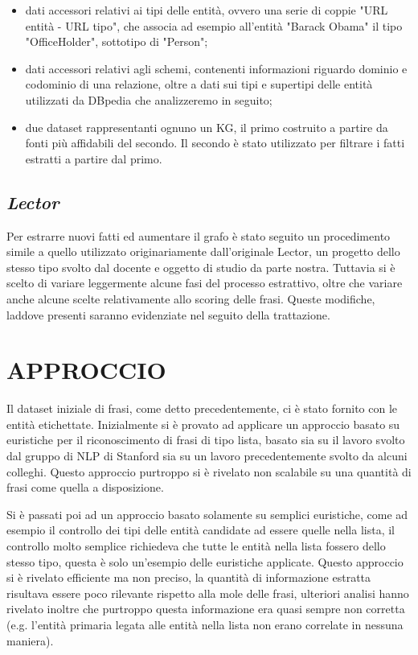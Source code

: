 \documentclass[10pt,a4paper,twocolumn]{article}
\begin{document}
\begin{itemize}
\item dati accessori relativi ai tipi delle entità, ovvero una serie di coppie "URL entità - URL tipo", che associa ad esempio all'entità "Barack Obama" il tipo "OfficeHolder", sottotipo di "Person";

\item dati accessori relativi agli schemi, contenenti informazioni riguardo dominio e codominio di una relazione, oltre a dati sui tipi e supertipi delle entità utilizzati da DBpedia che analizzeremo in seguito;

\item due dataset rappresentanti ognuno un KG, il primo costruito a partire da fonti più affidabili del secondo. Il secondo è stato utilizzato per filtrare i fatti estratti a partire dal primo.
\end{itemize}

\subsection*{\textit{Lector}}

Per estrarre nuovi fatti ed aumentare il grafo è stato seguito un procedimento simile a quello utilizzato originariamente dall'originale  Lector, un progetto dello stesso tipo svolto dal docente e oggetto di studio da parte nostra. Tuttavia si è scelto di variare leggermente alcune fasi del processo estrattivo, oltre che variare anche alcune scelte relativamente allo scoring delle frasi. Queste modifiche, laddove presenti saranno evidenziate nel seguito della trattazione.

\section{APPROCCIO}

Il dataset iniziale di frasi, come detto precedentemente, ci è stato fornito con le entità etichettate. Inizialmente si è provato ad applicare un approccio basato su euristiche per il riconoscimento di frasi di tipo lista, basato sia su il lavoro svolto dal gruppo di NLP di Stanford sia su un lavoro precedentemente svolto da alcuni colleghi. Questo approccio purtroppo si è rivelato non scalabile su una quantità di frasi come quella a disposizione. 

Si è passati poi ad un approccio basato solamente su semplici euristiche, come ad esempio il controllo dei tipi delle entità candidate ad essere quelle nella lista, il controllo molto semplice richiedeva che tutte le entità nella lista fossero dello stesso tipo, questa è solo un'esempio delle euristiche applicate. Questo approccio si è rivelato efficiente ma non preciso, la quantità di informazione estratta risultava essere poco rilevante rispetto alla mole delle frasi, ulteriori analisi hanno rivelato inoltre che purtroppo questa informazione era quasi sempre non corretta (e.g. l'entità primaria legata alle entità nella lista non erano correlate in nessuna maniera).
\end{document}
